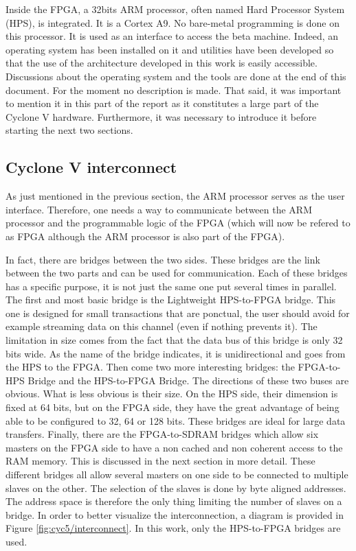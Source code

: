 Inside the FPGA, a 32bits ARM processor, often named Hard Processor System (HPS), is integrated. It is a Cortex A9. No bare-metal programming 
is done on this processor. It is used as an interface to access the beta machine. Indeed, 
an operating system has been installed on it and utilities have been developed so that the use of 
the architecture developed in this work is easily accessible. Discussions about the operating system 
and the tools are done at the end of this document. For the moment no description is made. That 
said, it was important to mention it in this part of the report as it constitutes a large part of 
the Cyclone V hardware. Furthermore, it was necessary to introduce it before starting the next two 
sections.

\subsection{Cyclone V interconnect}

As just mentioned in the previous section, the ARM processor serves as the user interface. 
Therefore, one needs a way to communicate between the ARM processor and the programmable logic of the 
FPGA (which will now be refered to as FPGA although the ARM processor is also part of the FPGA). 

In fact, there are bridges between the two sides. These bridges are the link between the two parts 
and can be used for communication. Each of these bridges has a specific purpose, it is not just the 
same one put several times in parallel. The first and most basic bridge is the Lightweight HPS-to-FPGA 
bridge. This one is designed for small transactions that are ponctual, the user should avoid for example 
streaming data on this channel (even if nothing prevents it). The limitation in size comes from the 
fact that the data bus of this bridge is only 32 bits wide. As the name of the bridge indicates, it 
is unidirectional and goes from the HPS to the FPGA. Then come two more interesting bridges: the 
FPGA-to-HPS Bridge and the HPS-to-FPGA Bridge. The directions of these two buses are obvious. What 
is less obvious is their size. On the HPS side, their dimension is fixed at 64 bits, but on the FPGA 
side, they have the great advantage of being able to be configured to 32, 64 or 128 bits. 
These bridges are ideal for large data transfers. Finally, there are the FPGA-to-SDRAM bridges which 
allow six masters on the FPGA side to have a non cached and non coherent access to the RAM memory. 
This is discussed in the next section in more detail. These different bridges all allow several
masters on one side to be connected to multiple slaves on the other. The selection of the 
slaves is done by byte aligned addresses. The address space is therefore the only thing limiting the 
number of slaves on a bridge. In order to better visualize the interconnection, a diagram is provided 
in Figure \ref{fig:cyc5/interconnect}. In this work, only the HPS-to-FPGA bridges are used.

